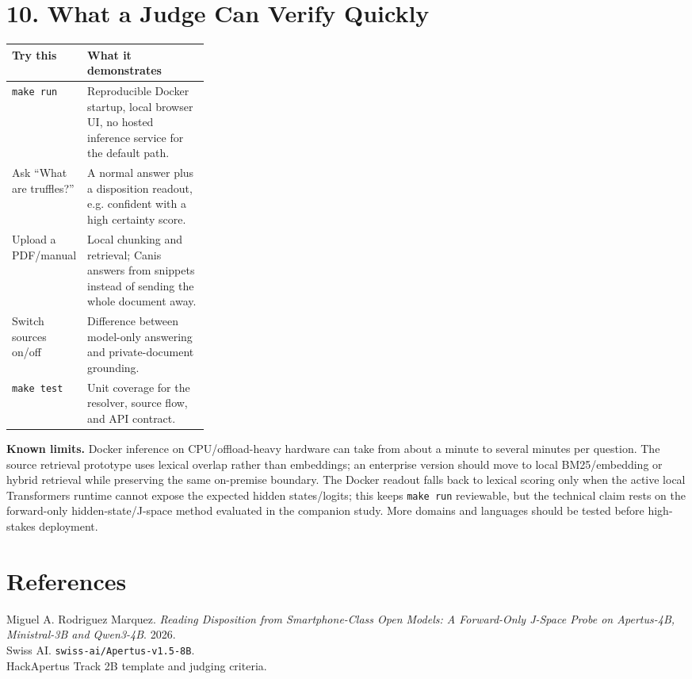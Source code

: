 \documentclass[10pt,a4paper]{article}
\newcommand{\sectionrule}{\vspace{-2pt}{\color{canisLine}\hrule}\vspace{4pt}}
\begin{document}
\section*{10. What a Judge Can Verify Quickly}
\sectionrule
\begin{tabularx}{\linewidth}{@{}p{0.29\linewidth}X@{}}
\toprule
\textbf{Try this} & \textbf{What it demonstrates} \\
\midrule
\texttt{make run} & Reproducible Docker startup, local browser UI, no hosted inference service for the default path. \\
Ask ``What are truffles?'' & A normal answer plus a disposition readout, e.g. confident with a high certainty score. \\
Upload a PDF/manual & Local chunking and retrieval; Canis answers from snippets instead of sending the whole document away. \\
Switch sources on/off & Difference between model-only answering and private-document grounding. \\
\texttt{make test} & Unit coverage for the resolver, source flow, and API contract. \\
\bottomrule
\end{tabularx}

\vspace{4pt}
\textbf{Known limits.} Docker inference on CPU/offload-heavy hardware can take from about a minute to several minutes per question. The source retrieval prototype uses lexical overlap rather than embeddings; an enterprise version should move to local BM25/embedding or hybrid retrieval while preserving the same on-premise boundary. The Docker readout falls back to lexical scoring only when the active local Transformers runtime cannot expose the expected hidden states/logits; this keeps \texttt{make run} reviewable, but the technical claim rests on the forward-only hidden-state/J-space method evaluated in the companion study. More domains and languages should be tested before high-stakes deployment.

\section*{References}
\sectionrule
\small
Miguel A. Rodriguez Marquez. \emph{Reading Disposition from Smartphone-Class Open Models: A Forward-Only J-Space Probe on Apertus-4B, Ministral-3B and Qwen3-4B}. 2026.\\
Swiss AI. \texttt{swiss-ai/Apertus-v1.5-8B}.\\
HackApertus Track 2B template and judging criteria.
\end{document}
